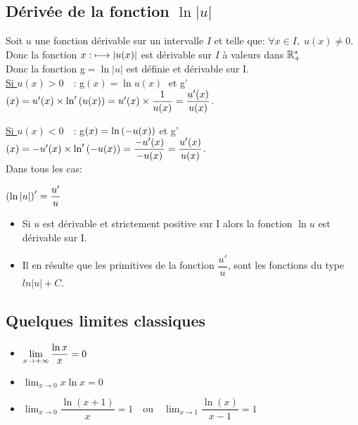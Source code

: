 \subsection*{Dérivée de la fonction $ \ln|u| $}
Soit   $ u $ une fonction dérivable sur un intervalle $I$  et  telle que:  $ \forall x \in I ,\; u(x)\neq 0 $.\\
Donc la fonction  $ x :\;\longmapsto \left\lvert u(x) \right\rvert $ est dérivable sur $I$ à valeurs dans $ \mathbb{R}_+^* $\\
Donc la fonction  g$=\ln|u|  $  est définie et dérivable  sur I.\\
\underline{Si $u(x)> 0 \quad$}: g$ (x)=\ln u( x)\; $ et\; g'$ (x)= u'(x) \times \ln'\left(u(x)\right)= u'(x)\times \dfrac{1}{u(x)} =\dfrac{u'(x)}{u(x)} $.

\underline{Si $u(x)< 0 \quad $}: g$ (x)=\ln\left(-u(x)\right) $\; et\; g'$(x)=- u'(x) \times \ln'\left(-u(x)\right) =\dfrac{-u'(x)}{-u(x)}= \dfrac{u'(x)}{u(x)}$.\\
Dans tous les cas: \quad


 $  \left(\ln|u|\right)^{\prime}= \dfrac{u'}{u}$ 



\begin{corollary}
\begin{itemize}
\item
 Si $u$ est dérivable et strictement positive sur I alors la fonction $ \ln u $ est dérivable sur I.
 \item Il en résulte que les primitives de la fonction $\dfrac{u'}{u}$,
sont les fonctions du type $ln |u| + C$.
\end{itemize}
\end{corollary}

\subsection*{Quelques limites classiques}

\begin{property}
\begin{itemize}
\item $\displaystyle \lim_{x \to +\infty}\dfrac{\ln x}{x}=0 $
\item   $ \displaystyle\lim_{x \to 0}x\ln x=0 $  
\item  $ \displaystyle\lim_{x \to 0} \dfrac{\ln(x+1)}{x}=1 \quad \text{ou} \quad \displaystyle\lim_{x \to 1} \dfrac{\ln(x)}{x-1}=1 $
\end{itemize}
\end{property}

